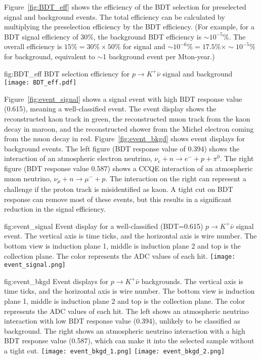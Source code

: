 Figure~\ref{fig:BDT_eff} shows the efficiency of the BDT selection for preselected signal and background events. The total efficiency can be calculated by multiplying the preselection efficiency by the BDT efficiency.  (For example, for a BDT signal efficiency of 30\%, the background BDT efficiency is $\sim 10^{-5}\%$.  The overall efficiency is $15\% = 30\% \times 50\%$ for signal and $\sim10^{-6} \% = 17.5\% \times \sim 10^{-5}\%$ for background, equivalent to $\sim$1 background event per Mton-year.)

\begin{dunefigure}
{fig:BDT_eff}
{BDT selection efficiency for $p\rightarrow K^{+} \bar{\nu}$ signal and background}
\texttt{[image: BDT\_eff.pdf]}
\end{dunefigure} 

Figure~\ref{fig:event_signal} shows a signal event with high BDT response value (0.615), meaning a well-classified event. The event display shows the reconstructed kaon track in green, the reconstructed muon track from the kaon decay in maroon, and the reconstructed shower from the Michel electron coming from the muon decay in red. Figure~\ref{fig:event_bkgd} shows event displays for background events.  The left figure (BDT response value of 0.394) shows the interaction of an atmospheric electron neutrino, $\nu_{e}+n\rightarrow e^{-}+p+\pi^{0}$. The right figure (BDT response value 0.587) shows a CCQE interaction of an atmospheric muon neutrino, $\nu_{
\mu}+n \rightarrow \mu^{-}+p$. The interaction on the right can represent a challenge if the proton track is misidentified as kaon. A tight cut on BDT response can remove most of these events, but this results in a significant reduction in the signal efficiency.

\begin{dunefigure}
{fig:event_signal}
{Event display for a well-classified (BDT=0.615) $p\rightarrow K^{+} \bar{\nu}$ signal event.  The vertical axis is time ticks, and the horizontal axis is wire number. The bottom view is induction plane 1, middle is induction plane 2 and top is the collection plane. The color represents the ADC values of each hit. }
\texttt{[image: event\_signal.png]}
\end{dunefigure} 

\begin{dunefigure}
{fig:event_bkgd}
{Event displays for $p\rightarrow K^{+} \bar{\nu}$ backgrounds.  The vertical axis is time ticks, and the horizontal axis is wire number. The bottom view is induction plane 1, middle is induction plane 2 and top is the collection plane. The color represents the ADC values of each hit. The left shows an atmospheric neutrino interaction with low BDT response value (0.394), unlikely to be classified as background. The right shows an atmospheric neutrino interaction with a high BDT response value (0.587), which can make it into the selected sample without a tight cut.}
\texttt{[image: event\_bkgd\_1.png]}
\texttt{[image: event\_bkgd\_2.png]}
\end{dunefigure}

